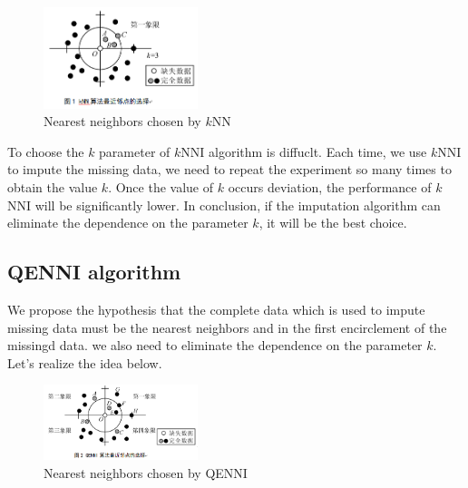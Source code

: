 \documentclass[print]{jicspack}
\begin{document}
\begin{figure}[h]
\centering
\includegraphics[angle=0, width=0.4\textwidth]{figure1.png}
\caption{Nearest neighbors chosen by $k$NN}
\label{fig:figure1}
\end{figure}

To choose the $k$ parameter of $k$NNI algorithm is diffuclt. Each time, we use $k$NNI to impute the missing data, we need to repeat the experiment so many times to obtain the value $k$. Once the value of $k$ occurs deviation, the performance of $k$NNI will be significantly lower. In conclusion, if the imputation algorithm can eliminate the dependence on the parameter $k$, it will be the best choice.

\subsection{QENNI algorithm}
\label{2.3}
We propose the hypothesis that the complete data which is used to impute missing data must be the nearest neighbors and in the first encirclement of the missingd data. we also need to eliminate the dependence on the parameter $k$. Let's realize the idea below.

\begin{figure}[h]
\centering
\includegraphics[angle=0, width=0.4\textwidth]{figure2.png}
\caption{Nearest neighbors chosen by QENNI}
\label{fig:figure2}
\end{figure}
\end{document}
